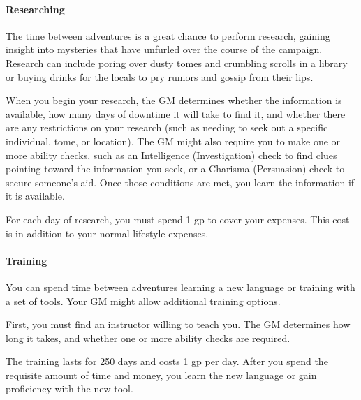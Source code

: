 \documentclass[
]{article}
\begin{document}
\hypertarget{researching}{%
\paragraph{Researching}\label{researching}}

The time between adventures is a great chance to perform research,
gaining insight into mysteries that have unfurled over the course of the
campaign. Research can include poring over dusty tomes and crumbling
scrolls in a library or buying drinks for the locals to pry rumors and
gossip from their lips.

When you begin your research, the GM determines whether the information
is available, how many days of downtime it will take to find it, and
whether there are any restrictions on your research (such as needing to
seek out a specific individual, tome, or location). The GM might also
require you to make one or more ability checks, such as an Intelligence
(Investigation) check to find clues pointing toward the information you
seek, or a Charisma (Persuasion) check to secure someone's aid. Once
those conditions are met, you learn the information if it is available.

For each day of research, you must spend 1 gp to cover your expenses.
This cost is in addition to your normal lifestyle expenses.

\hypertarget{training}{%
\paragraph{Training}\label{training}}

You can spend time between adventures learning a new language or
training with a set of tools. Your GM might allow additional training
options.

First, you must find an instructor willing to teach you. The GM
determines how long it takes, and whether one or more ability checks are
required.

The training lasts for 250 days and costs 1 gp per day. After you spend
the requisite amount of time and money, you learn the new language or
gain proficiency with the new tool.
\end{document}
